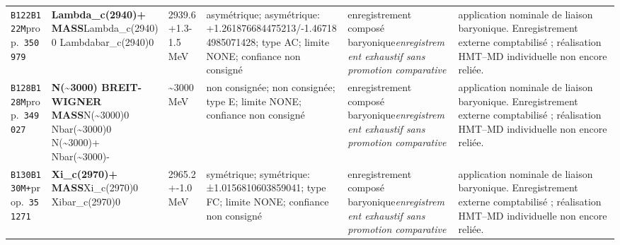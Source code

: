 \begin{landscape}
\begin{longtable}{L{1.85cm}L{4.45cm}L{2.35cm}L{4.05cm}L{3.35cm}L{7.15cm}}
\texttt{B122}\newline \texttt{B122M}\newline prop.\ \texttt{350979} & \textbf{Lambda\_\allowbreak{}c(2940)+ MASS}\newline Lambda\_\allowbreak{}c(2940)0 \textbar{}\allowbreak{} Lambdabar\_\allowbreak{}c(2940)0 & 2939.6+1.3-1.5\,MeV & asymétrique; asymétrique: +1.261876684475213/-1.467184985071428; type AC; limite NONE; confiance non consigné & enregistrement composé baryonique\newline \emph{enregistrement exhaustif sans promotion comparative} & application nominale de liaison baryonique. Enregistrement externe comptabilisé ; réalisation HMT--MD individuelle non encore reliée. \\
\texttt{B128}\newline \texttt{B128M}\newline prop.\ \texttt{349027} & \textbf{N(\textasciitilde{}3000) BREIT-WIGNER MASS}\newline N(\textasciitilde{}3000)0 \textbar{}\allowbreak{} Nbar(\textasciitilde{}3000)0 \textbar{}\allowbreak{} N(\textasciitilde{}3000)+ \textbar{}\allowbreak{} Nbar(\textasciitilde{}3000)- & \textasciitilde{}3000\,MeV & non consignée; non consignée; type E; limite NONE; confiance non consigné & enregistrement composé baryonique\newline \emph{enregistrement exhaustif sans promotion comparative} & application nominale de liaison baryonique. Enregistrement externe comptabilisé ; réalisation HMT--MD individuelle non encore reliée. \\
\texttt{B130}\newline \texttt{B130M+}\newline prop.\ \texttt{351271} & \textbf{Xi\_\allowbreak{}c(2970)+ MASS}\newline Xi\_\allowbreak{}c(2970)0 \textbar{}\allowbreak{} Xibar\_\allowbreak{}c(2970)0 & 2965.2+-1.0\,MeV & symétrique; symétrique: ±1.0156810603859041; type FC; limite NONE; confiance non consigné & enregistrement composé baryonique\newline \emph{enregistrement exhaustif sans promotion comparative} & application nominale de liaison baryonique. Enregistrement externe comptabilisé ; réalisation HMT--MD individuelle non encore reliée. \\

\end{longtable}
\end{landscape}

